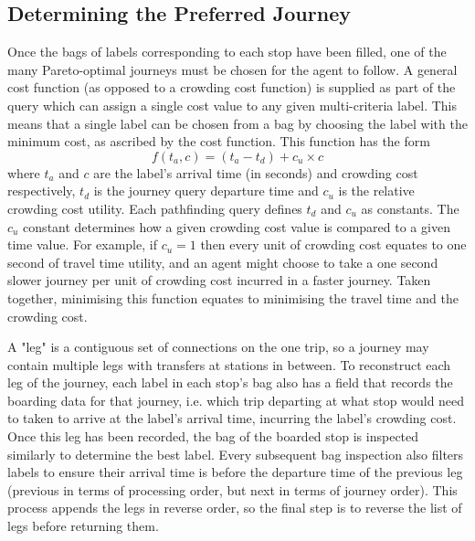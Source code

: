 \subsection{Determining the Preferred Journey}
\label{sec:FinalJourneyCostFunction}
Once the bags of labels corresponding to each stop have been filled, one of the many Pareto-optimal journeys must be chosen for the agent to follow. A general cost function (as opposed to a crowding cost function) is supplied as part of the query which can assign a single cost value to any given multi-criteria label. This means that a single label can be chosen from a bag by choosing the label with the minimum cost, as ascribed by the cost function. This function has the form 
\begin{equation}
    f(t_a, c) = (t_a - t_d) + c_u \times c 
    \label{eqn:cost_utility}
\end{equation}
where $t_a$ and $c$ are the label's arrival time (in seconds) and crowding cost respectively, $t_d$ is the journey query departure time and $c_u$ is the relative crowding cost utility. Each pathfinding query defines $t_d$ and $c_u$ as constants. The $c_u$ constant determines how a given crowding cost value is compared to a given time value. For example, if $c_u = 1$ then every unit of crowding cost equates to one second of travel time utility, and an agent might choose to take a one second slower journey per unit of crowding cost incurred in a faster journey. Taken together, minimising this function equates to minimising the travel time and the crowding cost.

A "leg" is a contiguous set of connections on the one trip, so a journey may contain multiple legs with transfers at stations in between. To reconstruct each leg of the journey, each label in each stop's bag also has a field that records the boarding data for that journey, i.e. which trip departing at what stop would need to taken to arrive at the label's arrival time, incurring the label's crowding cost. Once this leg has been recorded, the bag of the boarded stop is inspected similarly to determine the best label. Every subsequent bag inspection also filters labels to ensure their arrival time is before the departure time of the previous leg (previous in terms of processing order, but next in terms of journey order). This process appends the legs in reverse order, so the final step is to reverse the list of legs before returning them.

